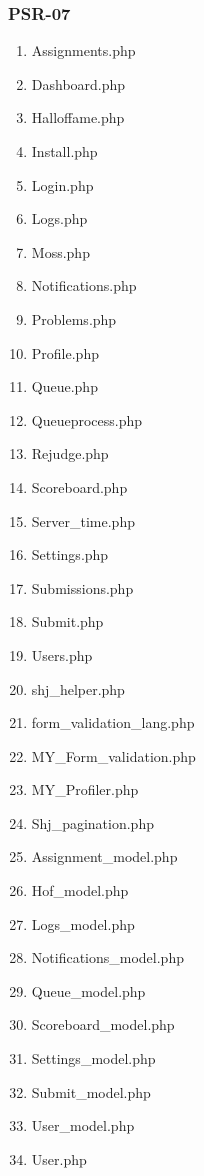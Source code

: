 \subsubsection{PSR-07}
\begin{enumerate}
	\item Assignments.php
	\item Dashboard.php
	\item Halloffame.php
	\item Install.php
	\item Login.php
	\item Logs.php
	\item Moss.php
	\item Notifications.php
	\item Problems.php
	\item Profile.php
	\item Queue.php
	\item Queueprocess.php
	\item Rejudge.php
	\item Scoreboard.php
	\item Server\_time.php
	\item Settings.php
	\item Submissions.php
	\item Submit.php
	\item Users.php
	\item shj\_helper.php
	\item form\_validation\_lang.php
	\item MY\_Form\_validation.php
	\item MY\_Profiler.php
	\item Shj\_pagination.php
	\item Assignment\_model.php
	\item Hof\_model.php
	\item Logs\_model.php
	\item Notifications\_model.php
	\item Queue\_model.php
	\item Scoreboard\_model.php
	\item Settings\_model.php
	\item Submit\_model.php
	\item User\_model.php
	\item User.php
\end{enumerate}


